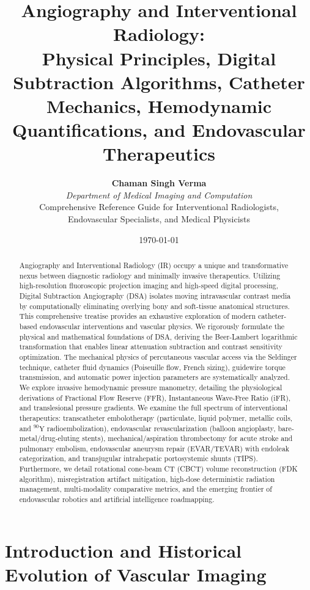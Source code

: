 \documentclass[11pt,a4paper]{article}
\title{\textbf{\huge Angiography and Interventional Radiology:}\\[0.4em]
\Large Physical Principles, Digital Subtraction Algorithms, Catheter Mechanics, Hemodynamic Quantifications, and Endovascular Therapeutics}
\author{\textbf{Chaman Singh Verma} \\
\textit{Department of Medical Imaging and Computation} \\
\small \textsf{Comprehensive Reference Guide for Interventional Radiologists,}\\[0.2em]
\small \textsf{Endovascular Specialists, and Medical Physicists}}
\date{\today}
\begin{document}
\maketitle

\begin{abstract}
Angiography and Interventional Radiology (IR) occupy a unique and transformative nexus between diagnostic radiology and minimally invasive therapeutics. Utilizing high-resolution fluoroscopic projection imaging and high-speed digital processing, Digital Subtraction Angiography (DSA) isolates moving intravascular contrast media by computationally eliminating overlying bony and soft-tissue anatomical structures. This comprehensive treatise provides an exhaustive exploration of modern catheter-based endovascular interventions and vascular physics. We rigorously formulate the physical and mathematical foundations of DSA, deriving the Beer-Lambert logarithmic transformation that enables linear attenuation subtraction and contrast sensitivity optimization. The mechanical physics of percutaneous vascular access via the Seldinger technique, catheter fluid dynamics (Poiseuille flow, French sizing), guidewire torque transmission, and automatic power injection parameters are systematically analyzed. We explore invasive hemodynamic pressure manometry, detailing the physiological derivations of Fractional Flow Reserve (FFR), Instantaneous Wave-Free Ratio (iFR), and translesional pressure gradients. We examine the full spectrum of interventional therapeutics: transcatheter embolotherapy (particulate, liquid polymer, metallic coils, and $^{90}\text{Y}$ radioembolization), endovascular revascularization (balloon angioplasty, bare-metal/drug-eluting stents), mechanical/aspiration thrombectomy for acute stroke and pulmonary embolism, endovascular aneurysm repair (EVAR/TEVAR) with endoleak categorization, and transjugular intrahepatic portosystemic shunts (TIPS). Furthermore, we detail rotational cone-beam CT (CBCT) volume reconstruction (FDK algorithm), misregistration artifact mitigation, high-dose deterministic radiation management, multi-modality comparative metrics, and the emerging frontier of endovascular robotics and artificial intelligence roadmapping.
\end{abstract}

\tableofcontents
\newpage

\section{Introduction and Historical Evolution of Vascular Imaging}
\end{document}
